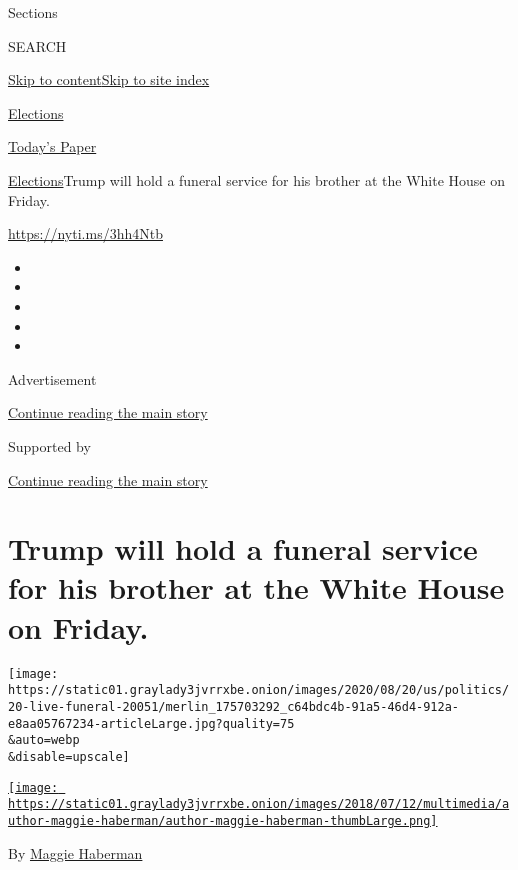 Sections

SEARCH

\protect\hyperlink{site-content}{Skip to
content}\protect\hyperlink{site-index}{Skip to site index}

\href{https://www.nytimes3xbfgragh.onion/news-event/2020-election}{Elections}

\href{https://myaccount.nytimes3xbfgragh.onion/auth/login?response_type=cookie\&client_id=vi}{}

\href{https://www.nytimes3xbfgragh.onion/section/todayspaper}{Today's
Paper}

\href{/news-event/2020-election}{Elections}\textbar{}Trump will hold a
funeral service for his brother at the White House on Friday.

\url{https://nyti.ms/3hh4Ntb}

\begin{itemize}
\item
\item
\item
\item
\item
\end{itemize}

Advertisement

\protect\hyperlink{after-top}{Continue reading the main story}

Supported by

\protect\hyperlink{after-sponsor}{Continue reading the main story}

\hypertarget{trump-will-hold-a-funeral-service-for-his-brother-at-the-white-house-on-friday}{%
\section{Trump will hold a funeral service for his brother at the White
House on
Friday.}\label{trump-will-hold-a-funeral-service-for-his-brother-at-the-white-house-on-friday}}

\texttt{[image: https://static01.graylady3jvrrxbe.onion/images/2020/08/20/us/politics/20-live-funeral-20051/merlin\_175703292\_c64bdc4b-91a5-46d4-912a-e8aa05767234-articleLarge.jpg?quality=75\\\&auto=webp\\\&disable=upscale]}

\href{https://www.nytimes3xbfgragh.onion/by/maggie-haberman}{\texttt{[image: https://static01.graylady3jvrrxbe.onion/images/2018/07/12/multimedia/author-maggie-haberman/author-maggie-haberman-thumbLarge.png]}}

By \href{https://www.nytimes3xbfgragh.onion/by/maggie-haberman}{Maggie
Haberman}

